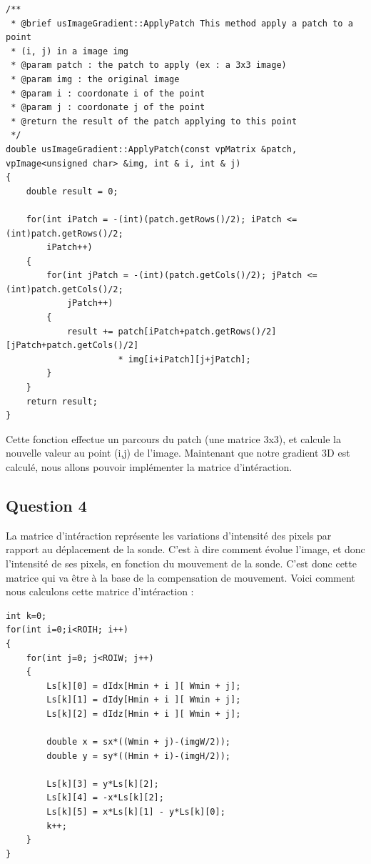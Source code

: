 \documentclass[a4paper,11pt]{article}
\begin{document}
\begin{verbatim}
/**
 * @brief usImageGradient::ApplyPatch This method apply a patch to a point 
 * (i, j) in a image img
 * @param patch : the patch to apply (ex : a 3x3 image)
 * @param img : the original image
 * @param i : coordonate i of the point
 * @param j : coordonate j of the point
 * @return the result of the patch applying to this point
 */
double usImageGradient::ApplyPatch(const vpMatrix &patch, 
vpImage<unsigned char> &img, int & i, int & j) 
{
    double result = 0;

    for(int iPatch = -(int)(patch.getRows()/2); iPatch <= (int)patch.getRows()/2; 
        iPatch++) 
    {
        for(int jPatch = -(int)(patch.getCols()/2); jPatch <= (int)patch.getCols()/2; 
            jPatch++) 
        {
            result += patch[iPatch+patch.getRows()/2][jPatch+patch.getCols()/2] 
            		  * img[i+iPatch][j+jPatch];
        }
    }
    return result;
}
\end{verbatim}

Cette fonction effectue un parcours du patch (une matrice 3x3), et calcule la nouvelle valeur au point (i,j) de l'image. Maintenant que notre gradient 3D est calcul\'e, nous allons pouvoir impl\'ementer la matrice d'int\'eraction.

\subsection{Question 4}
La matrice d'int\'eraction repr\'esente les variations d'intensit\'e des pixels par rapport au d\'eplacement de la sonde. C'est \`a dire comment \'evolue l'image, et donc l'intensit\'e de ses pixels, en fonction du mouvement de la sonde. C'est donc cette matrice qui va \^etre \`a la base de la compensation de mouvement. Voici comment nous calculons cette matrice d'int\'eraction :

\begin{verbatim}
int k=0;
for(int i=0;i<ROIH; i++) 
{
    for(int j=0; j<ROIW; j++) 
    {
        Ls[k][0] = dIdx[Hmin + i ][ Wmin + j];
        Ls[k][1] = dIdy[Hmin + i ][ Wmin + j];
        Ls[k][2] = dIdz[Hmin + i ][ Wmin + j];

        double x = sx*((Wmin + j)-(imgW/2));
        double y = sy*((Hmin + i)-(imgH/2));

        Ls[k][3] = y*Ls[k][2];
        Ls[k][4] = -x*Ls[k][2];
        Ls[k][5] = x*Ls[k][1] - y*Ls[k][0];
        k++;
    }
}
\end{verbatim}
\end{document}
